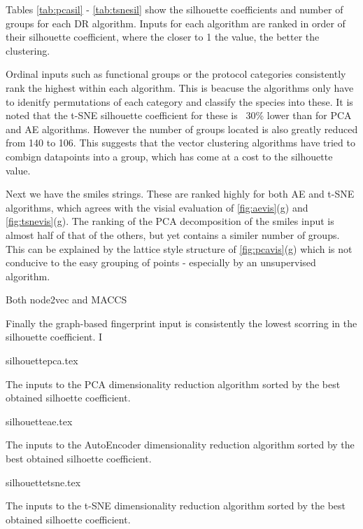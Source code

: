 Tables \ref{tab:pcasil} - \ref{tab:tsnesil} show the silhouette coefficients and number of groups for each DR algorithm. Inputs for each algorithm are ranked in order of their silhouette coefficient, where the closer to 1 the value, the better the clustering. 

Ordinal inputs such as functional groups or the protocol categories consistently rank the highest within each algorithm. This is beacuse the algorithms only have to idenitfy permutations of each category and classify the species into these. It is noted that the t-SNE silhouette coefficient for these is ~30\% lower than for PCA and AE algorithms. However the number of groups located is also greatly reduced from 140 to 106. This suggests that the vector clustering algorithms have tried to combign datapoints into a group, which has come at a cost to the silhouette value. 

Next we have the smiles strings. These are ranked highly for both AE and t-SNE algorithms, which agrees with the visial evaluation of \autoref{fig:aevis}(g) and \autoref{fig:tsnevis}(g). The ranking of the PCA decomposition of the smiles input is almost half of that of the others, but yet contains a similer number of groups. This can be explained by the lattice style structure of \autoref{fig:pcavis}(g) which is not conducive to the easy grouping of points - especially by an unsupervised algorithm. 

Both node2vec and MACCS 
 


Finally the graph-based fingerprint input is consistently the lowest scorring in the silhouette coefficient. I

\begin{table}[H]
    \centering
        {silhouettepca.tex}
        \caption{The inputs to the PCA dimensionality reduction algorithm sorted by the best obtained silhoette coefficient.  }
        \label{tab:pcasil}
\end{table}


\begin{table}[H]
    \centering
        {silhouetteae.tex}
        \caption{The inputs to the AutoEncoder dimensionality reduction algorithm sorted by the best obtained silhoette coefficient.  }
        \label{tab:aesil}
\end{table}




\begin{table}[H]
    \centering
        {silhouettetsne.tex}
        \caption{The inputs to the t-SNE dimensionality reduction algorithm sorted by the best obtained silhoette coefficient.  }
        \label{tab:tsnesil}
\end{table}









